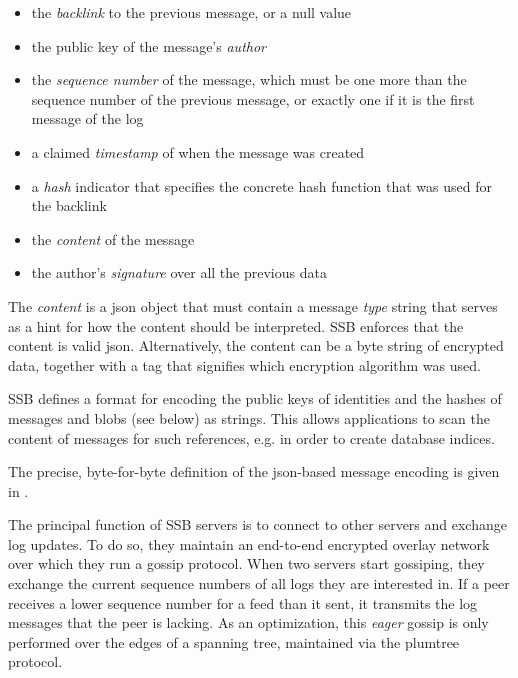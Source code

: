 \documentclass[sigconf]{acmart}
\begin{document}
\begin{itemize}

\item the {\em backlink} to the previous message, or a null value

\item the public key of the message's {\em author}

\item the {\em sequence number} of the message, which must be one more than the sequence number of the previous message, or exactly one if it is the first message of the log

\item a claimed {\em timestamp} of when the message was created

\item a {\em hash} indicator that specifies the concrete hash function that was used for the backlink

\item the {\em content} of the message

\item the author's {\em signature} over all the previous data

\end{itemize}

The {\em content} is a json object that must contain a message {\em type} string that serves as a hint for how the content should be interpreted. SSB enforces that the content is valid json.
Alternatively, the content can be a byte string of encrypted data, together with a tag that signifies which encryption algorithm was used.

SSB defines a format for encoding the public keys of identities and the hashes of messages and blobs (see below) as strings. This allows applications to scan the content of messages for such references, e.g. in order to create database indices.

The precise, byte-for-byte definition of the json-based message encoding is given in \cite{ssb-spec-messages}.

The principal function of SSB servers is to connect to other servers and exchange log updates. To do so, they maintain an end-to-end encrypted overlay network over which they run a gossip protocol. When two servers start gossiping, they exchange the current sequence numbers of all logs they are interested in. If a peer receives a lower sequence number for a feed than it sent, it transmits the log messages that the peer is lacking. As an optimization, this {\em eager} gossip is only performed over the edges of a spanning tree, maintained via the plumtree~\cite{leitao2007epidemic} protocol.
\end{document}
